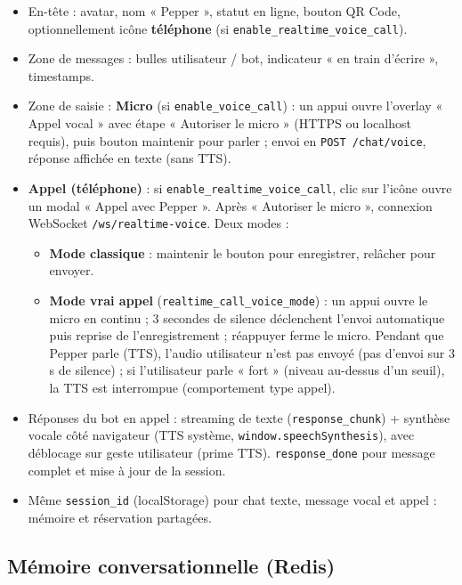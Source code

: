 \documentclass[12pt,a4paper]{article}
\begin{document}
\begin{itemize}[noitemsep]
  \item En-tête : avatar, nom « Pepper », statut en ligne, bouton QR Code, optionnellement icône \textbf{téléphone} (si \texttt{enable\_realtime\_voice\_call}).
  \item Zone de messages : bulles utilisateur / bot, indicateur « en train d'écrire », timestamps.
  \item Zone de saisie : \textbf{Micro} (si \texttt{enable\_voice\_call}) : un appui ouvre l'overlay « Appel vocal » avec étape « Autoriser le micro » (HTTPS ou localhost requis), puis bouton maintenir pour parler ; envoi en \texttt{POST /chat/voice}, réponse affichée en texte (sans TTS).
  \item \textbf{Appel (téléphone)} : si \texttt{enable\_realtime\_voice\_call}, clic sur l'icône ouvre un modal « Appel avec Pepper ». Après « Autoriser le micro », connexion WebSocket \texttt{/ws/realtime-voice}. Deux modes :
  \begin{itemize}[noitemsep]
    \item \textbf{Mode classique} : maintenir le bouton pour enregistrer, relâcher pour envoyer.
    \item \textbf{Mode vrai appel} (\texttt{realtime\_call\_voice\_mode}) : un appui ouvre le micro en continu ; 3 secondes de silence déclenchent l'envoi automatique puis reprise de l'enregistrement ; réappuyer ferme le micro. Pendant que Pepper parle (TTS), l'audio utilisateur n'est pas envoyé (pas d'envoi sur 3 s de silence) ; si l'utilisateur parle « fort » (niveau au-dessus d'un seuil), la TTS est interrompue (comportement type appel).
  \end{itemize}
  \item Réponses du bot en appel : streaming de texte (\texttt{response\_chunk}) + synthèse vocale côté navigateur (TTS système, \texttt{window.speechSynthesis}), avec déblocage sur geste utilisateur (prime TTS). \texttt{response\_done} pour message complet et mise à jour de la session.
  \item Même \texttt{session\_id} (localStorage) pour chat texte, message vocal et appel : mémoire et réservation partagées.
\end{itemize}

\subsection{Mémoire conversationnelle (Redis)}
\end{document}
